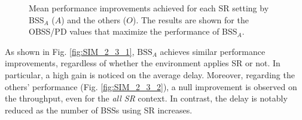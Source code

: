 \documentclass{ieeeaccess}
\begin{document}
\begin{figure}[ht!]
	\centering		
	\caption{Mean performance improvements achieved for each SR setting by BSS$_A$ ($A$) and the others ($O$). The results are shown for the OBSS/PD values that maximize the performance of BSS$_A$.}\label{fig:SIM_2_3}
\end{figure}

As shown in Fig. \ref{fig:SIM_2_3_1}, $\text{BSS}_A$ achieves similar performance improvements, regardless of whether the environment applies SR or not. In particular, a high gain is noticed on the average delay. Moreover, regarding the others' performance (Fig. \ref{fig:SIM_2_3_2}), a null improvement is observed on the throughput, even for the \emph{all SR} context. In contrast, the delay is notably reduced as the number of BSSs using SR increases.

\end{document}
